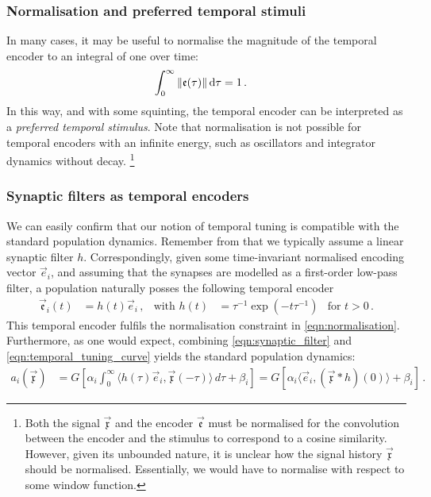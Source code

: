 \subsubsection{Normalisation and preferred temporal stimuli}
In many cases, it may be useful to normalise the magnitude of the temporal encoder to an integral of one over time:
\begin{align}
	\int_{0}^\infty \| \mathbf{\mathfrak{e}}(\tau) \| \,\mathrm{d} \tau &= 1 \,.
	\label{eqn:normalisation}
\end{align}
In this way, and with some squinting, the temporal encoder can be interpreted as a \emph{preferred temporal stimulus}.
Note that normalisation is not possible for temporal encoders with an infinite energy, such as oscillators and integrator dynamics without decay.%
\footnote{Both the signal $\vec{\mathfrak{x}}$ and the encoder $\vec{\mathfrak{e}}$ must be normalised for the convolution between the encoder and the stimulus to correspond to a cosine similarity.
However, given its unbounded nature, it is unclear how the signal history $\vec{\mathfrak{x}}$ should be normalised.
Essentially, we would have to normalise with respect to some window function.}

\subsubsection{Synaptic filters as temporal encoders}
We can easily confirm that our notion of temporal tuning is compatible with the standard \NEF population dynamics.
Remember from  that we typically assume a linear synaptic filter $h$.
Correspondingly, given some time-invariant normalised encoding vector $\vec e_i$, and assuming that the synapses are modelled as a first-order low-pass filter, a population naturally posses the following temporal encoder
\begin{align}
	\vec{\mathfrak{e}}_i(t)
		&= h(t) \vec e_i \,, & \text{with } h(t) &= \tau^{-1} \exp(-t \tau^{-1}) & \text{for } t > 0 \,.
	\label{eqn:synaptic_filter}
\end{align}
This temporal encoder fulfils the normalisation constraint in \cref{eqn:normalisation}.
Furthermore, as one would expect, combining \cref{eqn:synaptic_filter} and \cref{eqn:temporal_tuning_curve} yields the standard \NEF population dynamics:
\begin{align}
	a_i(\vec{\mathfrak{x}})
		&= G\left[ \alpha_i \! \int_{0}^\infty \!\!\! \big\langle h(\tau) \vec{e}_i, \vec{\mathfrak{x}}(-\tau) \big\rangle \,\mathit{d\tau} + \beta_i \right]
		 = G\left[ \alpha_i \big\langle \vec e_i, (\vec{\mathfrak{x}} \ast h)(0) \big\rangle + \beta_i \right] \,.
	\label{eqn:synaptic_filter_tuning_curve}
\end{align}

